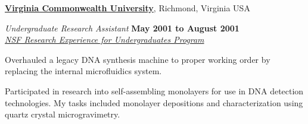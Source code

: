 \documentclass[10pt]{article}
\newenvironment{outerlist}[1][\enskip\textbullet]%
        {\begin{itemize}[#1]}{\end{itemize}%
         \vspace{-.6\baselineskip}}
\newenvironment{innerlist}[1][\enskip\textbullet]%
        {\begin{compactitem}[#1]}{\end{compactitem}}
\newcommand{\blankline}{\quad\pagebreak[2]}
\begin{document}
\blankline

\blankline
\href{http://www.vcu.edu}{\textbf{Virginia Commonwealth University}}, 
Richmond, Virginia USA
\begin{outerlist}
\item[] \textit{Undergraduate Research Assistant}%
        \hfill \textbf{May 2001 to August 2001} \\
        \href{http://www.vcu.edu/csbc/bbsi/people/faculty/anthony_guiseppi_elie.html}{\textit{NSF Research Experience for Undergraduates Program}}
\begin{innerlist}          
\item Overhauled a legacy DNA synthesis machine to proper working order by replacing the internal microfluidics system. \\
\item Participated in research into self-assembling monolayers for use in DNA detection technologies. My tasks
included monolayer depositions and characterization using quartz crystal microgravimetry. \\
\end{innerlist}
\end{outerlist}
\end{document}
